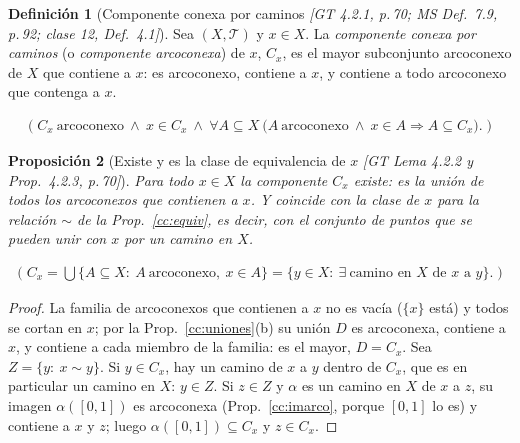 \documentclass[11pt,a4paper]{article}
\newcommand{\lgc}[1]{\par\vspace{-3pt}\begin{gather*}\big(\;#1\;\big)\end{gather*}\vspace{-6pt}}
\theoremstyle{definition}
\newtheorem{definicion}{Definición}[section]
\theoremstyle{plain}
\newtheorem{proposicion}[definicion]{Proposición}
\newcommand{\fnt}[1]{{\normalfont\small\itshape\color{gray!150!black}[#1]}}
\newcommand{\tp}{\mathcal{T}}
\begin{document}
\begin{definicion}[Componente conexa por caminos \fnt{GT 4.2.1, p.\,70; MS Def.\ 7.9, p.\,92; clase 12, Def.\ 4.1}]\label{cc:defcompcam}
Sea $(X,\tp)$ y $x\in X$. La \emph{componente conexa por caminos} (o \emph{componente arcoconexa}) de $x$, $C_x$, es el mayor subconjunto arcoconexo de $X$ que contiene a $x$: es arcoconexo, contiene a $x$, y contiene a todo arcoconexo que contenga a $x$.
\lgc{C_x\ \text{arcoconexo}\ \wedge\ x\in C_x\ \wedge\ \forall A\subseteq X\ \big(A\ \text{arcoconexo}\ \wedge\ x\in A\Rightarrow A\subseteq C_x\big).}
\end{definicion}

\begin{proposicion}[Existe y es la clase de equivalencia de $x$ \fnt{GT Lema 4.2.2 y Prop.\ 4.2.3, p.\,70}]\label{cc:existecam}
Para todo $x\in X$ la componente $C_x$ existe: es la unión de todos los arcoconexos que contienen a $x$. Y coincide con la clase de $x$ para la relación $\sim$ de la Prop.~\ref{cc:equiv}, es decir, con el conjunto de puntos que se pueden unir con $x$ por un camino en $X$.
\lgc{C_x=\bigcup\{A\subseteq X:\ A\ \text{arcoconexo},\ x\in A\}=\{y\in X:\ \exists\ \text{camino en } X \text{ de } x \text{ a } y\}.}
\end{proposicion}

\begin{proof}
La familia de arcoconexos que contienen a $x$ no es vacía ($\{x\}$ está) y todos se cortan en $x$; por la Prop.~\ref{cc:uniones}(b) su unión $D$ es arcoconexa, contiene a $x$, y contiene a cada miembro de la familia: es el mayor, $D=C_x$.
Sea $Z=\{y:\ x\sim y\}$. Si $y\in C_x$, hay un camino de $x$ a $y$ dentro de $C_x$, que es en particular un camino en $X$: $y\in Z$. Si $z\in Z$ y $\alpha$ es un camino en $X$ de $x$ a $z$, su imagen $\alpha([0,1])$ es arcoconexa (Prop.~\ref{cc:imarco}, porque $[0,1]$ lo es) y contiene a $x$ y $z$; luego $\alpha([0,1])\subseteq C_x$ y $z\in C_x$.
\end{proof}
\end{document}
